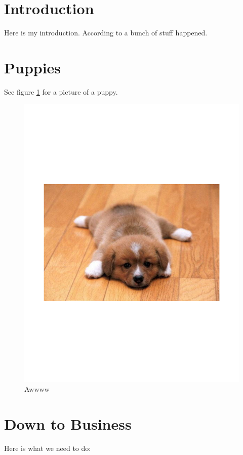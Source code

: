 \documentclass{article}
\begin{document}
\section{Introduction}
Here is my introduction.
According to \cite{sun} a bunch of stuff happened.

\section{Puppies}
See figure \ref{puppy} for a picture of a puppy.

\begin{figure}[h]
  \centering
  \includegraphics{puppies.pdf}
  \caption{Awwww}
  \label{puppy}
\end{figure}


\section{Down to Business}
Here is what we need to do:
\end{document}
